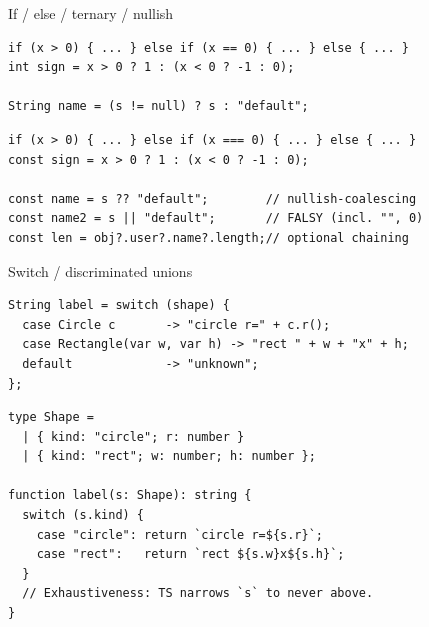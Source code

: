 \documentclass[10pt]{article}
\begin{document}
\begin{construct}{If / else / ternary / nullish}
\noindent
\begin{minipage}[t]{0.485\linewidth}
\begin{lstlisting}[style=java, title=Java]
if (x > 0) { ... } else if (x == 0) { ... } else { ... }
int sign = x > 0 ? 1 : (x < 0 ? -1 : 0);

String name = (s != null) ? s : "default";
\end{lstlisting}
\end{minipage}\hfill
\begin{minipage}[t]{0.485\linewidth}
\begin{lstlisting}[style=ts, title=TypeScript]
if (x > 0) { ... } else if (x === 0) { ... } else { ... }
const sign = x > 0 ? 1 : (x < 0 ? -1 : 0);

const name = s ?? "default";        // nullish-coalescing
const name2 = s || "default";       // FALSY (incl. "", 0)
const len = obj?.user?.name?.length;// optional chaining
\end{lstlisting}
\end{minipage}
\end{construct}

\begin{construct}{Switch / discriminated unions}
\noindent
\begin{minipage}[t]{0.485\linewidth}
\begin{lstlisting}[style=java, title=Java]
String label = switch (shape) {
  case Circle c       -> "circle r=" + c.r();
  case Rectangle(var w, var h) -> "rect " + w + "x" + h;
  default             -> "unknown";
};
\end{lstlisting}
\end{minipage}\hfill
\begin{minipage}[t]{0.485\linewidth}
\begin{lstlisting}[style=ts, title=TypeScript]
type Shape =
  | { kind: "circle"; r: number }
  | { kind: "rect"; w: number; h: number };

function label(s: Shape): string {
  switch (s.kind) {
    case "circle": return `circle r=${s.r}`;
    case "rect":   return `rect ${s.w}x${s.h}`;
  }
  // Exhaustiveness: TS narrows `s` to never above.
}
\end{lstlisting}
\end{minipage}
\end{construct}

\end{document}
